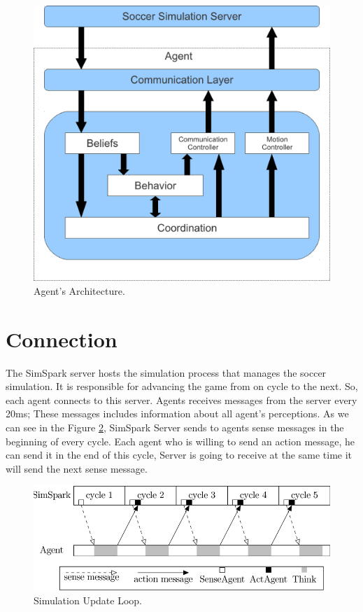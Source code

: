 \begin{figure}[htb!]
\centering
  \includegraphics[scale=0.6]{Chapter3/figures/Arch.pdf}
  \caption{Agent's Architecture.}
  \label{fig:Architecture}
\end{figure}


\section{Connection}
The SimSpark server hosts the simulation process that manages the soccer simulation. It is responsible for advancing the game from on cycle to the next. So, each agent
connects to this server. Agents receives messages from the server every 20ms; These messages includes information about all agent's perceptions. As we can see in the Figure \ref{fig:Simulation-Update-Loop}, SimSpark Server sends to agents sense messages in the beginning of every cycle. Each agent who is willing to send an action message, he can send it in the end of this cycle, Server is going to receive at the same time it will send the next sense message.
\begin{figure}[htb!]
\centering
  \includegraphics[scale=0.4]{Chapter2/figures/800px-SimulationUpdateLoopSynchronizationBetweenSimSparkAndAgent.png}
  \caption{Simulation Update Loop.}
  \label{fig:Simulation-Update-Loop}
\end{figure}



